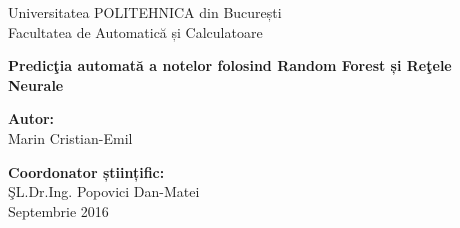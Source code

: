 \thispagestyle{empty}
\begin{center}
\large
Universitatea POLITEHNICA din București \\
Facultatea de Automatică și Calculatoare \\

{\LARGE
	\textbf{Predicţia automată a notelor folosind Random Forest și Reţele Neurale}
}

\vspace{3cm}
\textbf{Autor:}\\
Marin Cristian-Emil

\bigskip
\bigskip

\textbf{Coordonator științific:}\\
ŞL.Dr.Ing. Popovici Dan-Matei\\

Septembrie 2016 \\
\vspace*{1cm}
\end{center}
